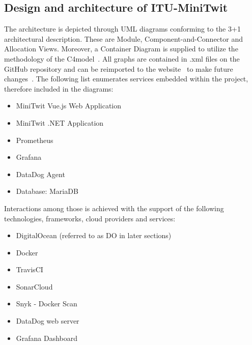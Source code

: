 \subsection{Design and architecture of ITU-MiniTwit}

The architecture is depicted through UML diagrams conforming to the 3+1 architectural description. These are Module, Component-and-Connector and Allocation Views. Moreover, a Container Diagram is supplied to utilize the methodology of the C4model~\cite{c4model}. All graphs are contained in .xml files on the GitHub repository and can be reimported to the website~\cite{drawio} to make future changes~\cite{architecturalViews}. The following list enumerates services embedded within the project, therefore included in the diagrams:

\begin{itemize}[noitemsep]
    \item MiniTwit Vue.js Web Application
    \item MiniTwit .NET Application
    \item Prometheus
    \item Grafana
    \item DataDog Agent
    \item Database: MariaDB
\end{itemize}

\vspace{3mm}

Interactions among those is achieved with the support of the following technologies, frameworks, cloud providers and services:

\begin{itemize}[noitemsep]
    \item DigitalOcean (referred to as DO in later sections)
    \item Docker
    \item TravisCI
    \item SonarCloud
    \item Snyk - Docker Scan
    \item DataDog web server
    \item Grafana Dashboard
\end{itemize}







